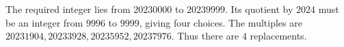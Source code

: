 The required integer lies from $20230000$ to $20239999$. Its quotient by $2024$ must be an integer from $9996$ to $9999$, giving four choices. The multiples are $20231904,20233928,20235952,20237976$. Thus there are $\boxed4$ replacements.
